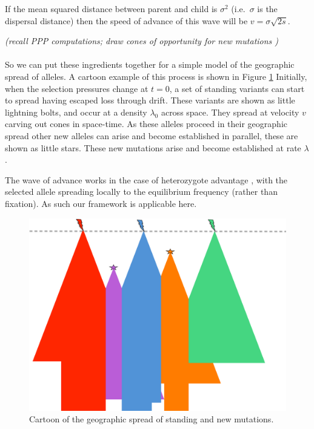 \documentclass{article}
\newcommand{\plr}[1]{{\it\color{blue}(#1)}}
\begin{document}
If the mean squared distance between parent and child is $\sigma^2$
(i.e.\ $\sigma$ is the dispersal distance) then the speed of advance
of this wave will be $v = \sigma \sqrt{2s}$. 

\plr{recall PPP computations; draw cones of opportunity for new mutations }

\paragraph{}
So we can put these ingredients together for a simple model of the
geographic spread of alleles. A cartoon example of this process is
shown in Figure \ref{fig:cartoon} Initially, when the selection
pressures change at $t=0$, a set of standing variants can start to
spread having escaped loss through drift. These variants are shown as
little lightning bolts, and occur at a density $\lambda_0$ across
space. 
They spread at velocity $v$ carving out cones in space-time. As these
alleles proceed in their geographic spread other new alleles can arise
and become established in parallel, these are shown as little
stars. These new mutations arise and become established at rate $\lambda$.

The wave of advance works in the case of heterozygote advantage
\citep{aronson1975nonlinear}, with the selected allele spreading
locally to the equilibrium frequency (rather than fixation). As such
our framework is applicable here.

\begin{figure}[ht]
  \begin{center}
    \includegraphics{spreading_alleles_trimmed}
  \end{center}
  \caption{
Cartoon of the geographic spread of standing and new mutations. 
}
  \label{fig:cartoon}
  
\end{figure}
\end{document}

